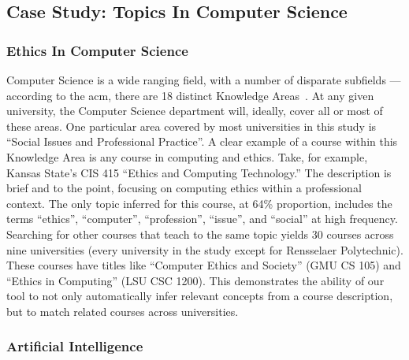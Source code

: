 
\subsection{Case Study: Topics In Computer Science}
\label{sec:eval-topics}


\subsubsection{Ethics In Computer Science}
\label{sec:eval-topics-ethics}


Computer Science is a wide ranging field, with a number of disparate subfields --- according to the \ac{acm}, there are 18 distinct Knowledge Areas~\cite{CS2013}.
At any given university, the Computer Science department will, ideally, cover all or most of these areas.
One particular area covered by most universities in this study is ``Social Issues and Professional Practice''.
A clear example of a course within this Knowledge Area is any course in computing and ethics.
Take, for example, Kansas State's CIS 415 ``Ethics and Computing Technology.''
The description is brief and to the point, focusing on computing ethics within a professional context.
The only topic inferred for this course, at 64\% proportion, includes the terms ``ethics'', ``computer'', ``profession'', ``issue'', and ``social'' at high frequency.
Searching for other courses that teach to the same topic yields 30 courses across nine universities (every university in the study except for Rensselaer Polytechnic).
These courses have titles like ``Computer Ethics and Society'' (GMU CS 105) and ``Ethics in Computing'' (LSU CSC 1200).
This demonstrates the ability of our tool to not only automatically infer relevant concepts from a course description, but to match related courses across universities.


\subsubsection{Artificial Intelligence}
\label{sec:eval-topics-ai}


